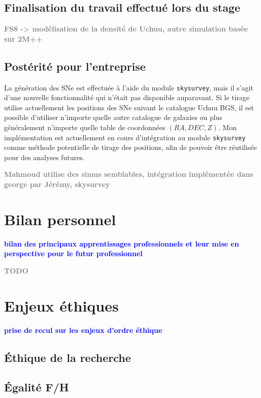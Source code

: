 \documentclass{book}
\newcommand{\todo}[1]{{\textcolor{gray}{\bf \large #1}}}
\newcommand{\consignes}[1]{{\textcolor{blue}{\bf \large #1}}}
\def\skysurvey{\texttt{skysurvey}\xspace}
\begin{document}
\section{Finalisation du travail effectué lors du stage}

\todo{FS8 -> modélisation de la densité de Uchuu, autre simulation basée sur 2M++}

\section{Postérité pour l'entreprise}


La génération des SNe est effectuée à l'aide du module \skysurvey, mais il s'agit d'une nouvelle fonctionnalité qui n'était pas disponible auparavant. Si le tirage utilise actuellement les positions des SNe suivant le catalogue Uchuu BGS, il est possible d'utiliser n'importe quelle autre catalogue de galaxies ou plus généralement n'importe quelle table de coordonnées $(RA,DEC,Z)$. Mon implémentation est actuellement en cours d'intégration au module \skysurvey comme méthode potentielle de tirage des positions, afin de pouvoir être réutilisée pour des analyses futures.

\todo{Mahmoud utilise des simus semblables, intégration implémentée dans george par Jérémy, skysurvey}




\chapter{Bilan personnel}
\consignes{bilan des principaux apprentissages professionnels et leur mise en perspective pour le futur professionnel}

\todo{TODO}



\chapter{Enjeux éthiques}
\consignes{prise de recul sur les enjeux d’ordre éthique}

\section{Éthique de la recherche}

\section{Égalité F/H}
\end{document}

